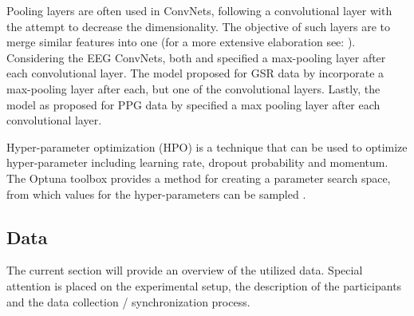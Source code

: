 \documentclass[12pt]{article}
\begin{document}
Pooling layers are often used in ConvNets, following a convolutional layer with the attempt to decrease the dimensionality. The objective of such layers are to merge similar features into one (for a more extensive elaboration see: \cite{lecun2015deep}). Considering the EEG ConvNets, both  and  specified a max-pooling layer after each convolutional layer. The model proposed for GSR data by  incorporate a max-pooling layer after each, but one of the convolutional layers. Lastly, the model as proposed for PPG data by \cite{biswas2019cornet}  specified a max pooling layer after each convolutional layer. 

Hyper-parameter optimization (HPO) is a technique that can be used to optimize hyper-parameter including learning rate, dropout probability and momentum. The Optuna toolbox provides a method for creating a parameter search space, from which values for the hyper-parameters can be sampled \cite{akiba2019optuna}. 

\subsection{Data}
The current section will provide an overview of the utilized data. Special attention is placed on the experimental setup, the description of the participants and the data collection / synchronization process. 
\end{document}
